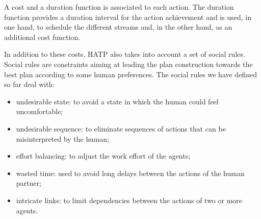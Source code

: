 \documentclass[preprint,3p,times]{elsarticle}
\begin{document}
A cost and a duration function is associated to each action.  The duration
function provides a duration interval for the action achievement and is used, in
one hand, to schedule the different streams and, in the other hand, as an
additional cost function.

In addition to these costs, HATP also takes into
account a set of social rules.  Social rules are constraints aiming at leading
the plan construction towards the best plan according to some human preferences.
The social rules we have defined so far deal with:

\begin{itemize}
\item undesirable state: to avoid a state in which the human could
  feel uncomfortable;
\item undesirable sequence: to eliminate sequences of actions that can
  be misinterpreted by the human;
\item effort balancing: to adjust the work effort of the agents;
\item wasted time: used to avoid long delays between the actions of
  the human partner;
\item intricate links: to limit dependencies between the actions of
  two or more agents.
\end{itemize}
\end{document}
